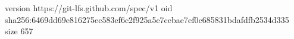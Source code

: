version https://git-lfs.github.com/spec/v1
oid sha256:6469dd69e816275ec583ef6c2f925a5e7cebae7ef0c685831bdafdfb2534d335
size 657
